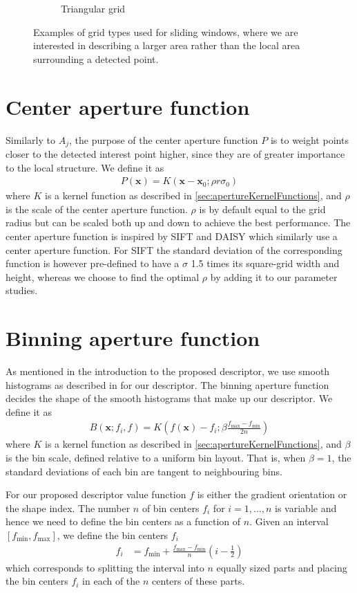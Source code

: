 \documentclass[thesis.tex]{subfiles}
\def\x{\mathbf{x}}
\begin{document}
\begin{figure}[tb]
\begin{subfigure}[t]{0.45\textwidth}
		\caption{Triangular grid}
		\label{fig:gridTypeTriangle}
	\end{subfigure}
	\caption{Examples of grid types used for sliding windows, where we are interested in describing a larger area rather than the local area surrounding a detected point.}
\label{fig:gridTypeWindow}
\end{figure}
%
\section{Center aperture function}
\label{sec:centerApertureFunction}
%
Similarly to $A_j$, the purpose of the center aperture function $P$ is to weight points closer to the detected interest point higher, since they are of greater importance to the local structure. We define it as
%
\begin{align}
P(\x) = K(\x - \x_0; \rho r \sigma_0)
\end{align}
%
where $K$ is a kernel function as described in \ref{sec:apertureKernelFunctions}, and $\rho$ is the scale of the center aperture function. $\rho$ is by default equal to the grid radius but can be scaled both up and down to achieve the best performance. The center aperture function is inspired by SIFT \cite{lowe2004distinctive} and DAISY \cite{tola2008fast} which similarly use a center aperture function. For SIFT the standard deviation of the corresponding function is however pre-defined to have a $\sigma$ 1.5 times its square-grid width and height, whereas we choose to find the optimal $\rho$ by adding it to our parameter studies.
%
\section{Binning aperture function}
\label{sec:binningApertureFunction}
%
As mentioned in the introduction to the proposed descriptor, we use smooth histograms as described in  for our descriptor. The binning aperture function decides the shape of the smooth histograms that make up our descriptor. We define it as
\begin{align}
	B(\x; f_i, f) = K \left( f(\x) - f_i; \beta \frac{f_\text{max} - f_\text{min}}{2n} \right)
\end{align}
where $K$ is a kernel function as described in \ref{sec:apertureKernelFunctions}, and $\beta$ is the bin scale, defined relative to a uniform bin layout. That is, when $\beta = 1$, the standard deviations of each bin are tangent to neighbouring bins.

For our proposed descriptor value function $f$ is either the gradient orientation or the shape index. The number $n$ of bin centers $f_i$ for $i = 1,\hdots,n$ is variable and hence we need to define the bin centers as a function of $n$. Given an interval $[f_\text{min},f_\text{max}]$, we define the bin centers $f_i$
\begin{align}
	\label{eq:binCenters}
	f_i &= f_\text{min} + \frac{f_\text{max}-f_\text{min}}{n} \left(i - \frac{1}{2} \right)
\end{align}
which corresponds to splitting the interval into $n$ equally sized parts and placing the bin centers $f_i$ in each of the $n$ centers of these parts.
\end{document}
